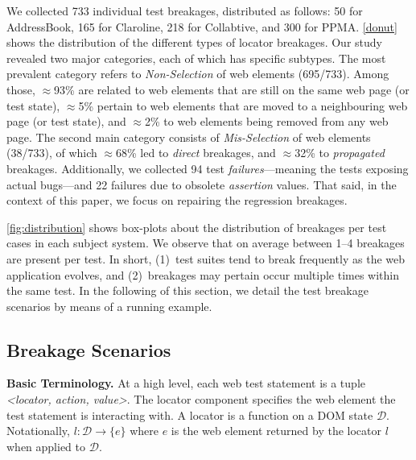 \label{sec:study}
We collected 733 individual test breakages, distributed as follows: 50 for AddressBook, 165 for Claroline, 218 for Collabtive, and 300 for PPMA.
\autoref{donut} shows the distribution of the different types of locator breakages. Our study revealed two major categories, each of which has specific subtypes. The most prevalent category refers to \textit{Non-Selection} of web elements (695/733). Among those, $\approx$93\% are related to web elements that are still on the same web page (or test state), $\approx$5\% pertain to web elements that are moved to a neighbouring web page (or test state), and $\approx$2\% to web elements being removed from any web page.
The second main category consists of \textit{Mis-Selection} of web elements (38/733), of which $\approx$68\% led to \textit{direct} breakages, and $\approx$32\% to \textit{propagated} breakages. 
Additionally, we collected 94 test \textit{failures}---meaning the tests exposing actual bugs---and 22 failures due to obsolete \textit{assertion} values.
%
That said, in the context of this paper, we focus on repairing the regression breakages. 

\autoref{fig:distribution} shows box-plots about the distribution of breakages per test cases in each subject system. We observe that on average between 1--4 breakages are present per test. 
In short, (1)~test suites tend to break frequently as the web application evolves, and (2)~breakages may pertain occur multiple times within the same test. 
In the following of this section, we detail the test breakage scenarios by means of a running example.

\subsection{Breakage Scenarios}\label{sec:breakage-scenarios}

\noindent
\textbf{Basic Terminology.}
At a high level, each web test statement is a tuple \textit{<locator, action, value>}. 
The locator component specifies the web element the test statement is interacting with. A locator is a function on a DOM state $\mathcal{D}$. Notationally, $l: \mathcal{D} \rightarrow \{e\}$ where $e$ is the web element returned by the locator $l$ when applied to $\mathcal{D}$. 
%



